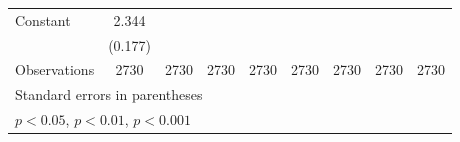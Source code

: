 \begin{table}[htbp]
\begin{tabular}{l*{8}{c}}
\addlinespace
Constant        &    2.344\sym{***}&                  &                  &                  &                  &                  &                  &                  \\
                &  (0.177)         &                  &                  &                  &                  &                  &                  &                  \\
\midrule
Observations    &     2730         &     2730         &     2730         &     2730         &     2730         &     2730         &     2730         &     2730         \\
\bottomrule
\multicolumn{9}{l}{\footnotesize Standard errors in parentheses}\\
\multicolumn{9}{l}{\footnotesize \sym{*} \(p<0.05\), \sym{**} \(p<0.01\), \sym{***} \(p<0.001\)}\\
\end{tabular}
\end{table}
